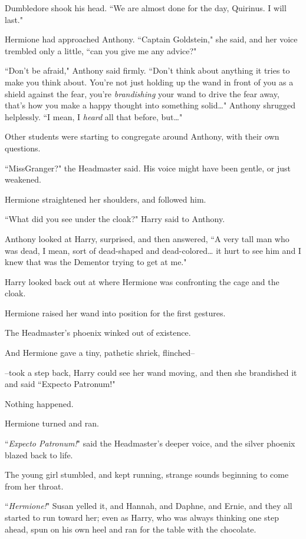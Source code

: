 Dumbledore shook his head. ``We are almost done for the day, Quirinus. I will last."

Hermione had approached Anthony. ``Captain Goldstein," she said, and her voice trembled only a little, ``can you give me any advice?"

``Don't be afraid," Anthony said firmly. ``Don't think about anything it tries to make you think about. You're not just holding up the wand in front of you as a shield against the fear, you're \emph{brandishing} your wand to drive the fear away, that's how you make a happy thought into something solid{\ldots}" Anthony shrugged helplessly. ``I mean, I \emph{heard} all that before, but{\ldots}"

Other students were starting to congregate around Anthony, with their own questions.

``Miss\?Granger?" the Headmaster said. His voice might have been gentle, or just weakened.

Hermione straightened her shoulders, and followed him.

``What did you see under the cloak?" Harry said to Anthony.

Anthony looked at Harry, surprised, and then answered, ``A very tall man who was dead, I mean, sort of dead-shaped and dead-colored{\ldots} it hurt to see him and I knew that was the Dementor trying to get at me."

Harry looked back out at where Hermione was confronting the cage and the cloak.

Hermione raised her wand into position for the first gestures.

The Headmaster's phoenix winked out of existence.

And Hermione gave a tiny, pathetic shriek, flinched\---

\---took a step back, Harry could see her wand moving, and then she brandished it and said ``Expecto Patronum!"

Nothing happened.

Hermione turned and ran.

``\emph{Expecto Patronum!}" said the Headmaster's deeper voice, and the silver phoenix blazed back to life.

The young girl stumbled, and kept running, strange sounds beginning to come from her throat.

``\emph{Hermione!}" Susan yelled it, and Hannah, and Daphne, and Ernie, and they all started to run toward her; even as Harry, who was always thinking one step ahead, spun on his own heel and ran for the table with the chocolate.

